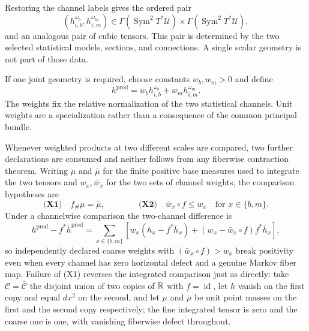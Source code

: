 Restoring the channel labels gives the ordered pair
\begin{equation}
(h_{i,b}^{\omega_b},h_{i,m}^{\omega_m})
\in\Gamma(\operatorname{Sym}^2T^*\mathcal U)
\times\Gamma(\operatorname{Sym}^2T^*\mathcal U),
\label{eq:pb-two-channel-pair}
\end{equation}
and an analogous pair of cubic tensors.  This pair is determined by the two
selected statistical models, sections, and connections.  A single scalar
geometry is not part of those data.  

If one joint geometry is required, choose constants $w_b,w_m>0$ and define
\begin{equation}
h^{\mathrm{prod}}
=w_bh_{i,b}^{\omega_b}+w_mh_{i,m}^{\omega_m}.
\label{eq:pb-weighted-channel-pullback}
\end{equation}
The weights fix the relative normalization of the two statistical channels.
Unit weights are a specialization rather than a consequence of the common
principal bundle.  

Whenever weighted products at two different scales are compared, two further
declarations are consumed and neither follows from any fiberwise contraction
theorem.  Writing $\mu$ and $\bar\mu$ for the finite positive base measures
used to integrate the two tensors and $w_x,\bar w_x$ for the two sets of
channel weights, the comparison hypotheses are
\begin{equation}
\textbf{(X1)}\quad f_\#\mu=\bar\mu,
\qquad\qquad
\textbf{(X2)}\quad \bar w_x\circ f\leq w_x
\quad\text{for }x\in\{b,m\}.
\label{eq:pb-cross-scale-declarations}
\end{equation}
Under a channelwise comparison the two-channel difference is
\begin{equation}
h^{\mathrm{prod}}-f^*\bar h^{\mathrm{prod}}
=\sum_{x\in\{b,m\}}
\left[
w_x\left(h_x-f^*\bar h_x\right)
+\left(w_x-\bar w_x\circ f\right)f^*\bar h_x
\right],
\label{eq:pb-two-channel-comparison}
\end{equation}
so independently declared coarse weights with $(\bar w_x\circ f)>w_x$ break
positivity even when every channel has zero horizontal defect and a genuine
Markov fiber map.  Failure of (X1) reverses the integrated comparison just as directly: take
$\mathcal C=\bar{\mathcal C}$ the disjoint union of two copies of $\mathbb R$ with
$f=\operatorname{id}$, let $h$ vanish on the first copy and equal $dx^2$ on the
second, and let $\mu$ and $\bar\mu$ be unit point masses on the first and the
second copy respectively; the fine integrated tensor is zero and the coarse one
is one, with vanishing fiberwise defect throughout.  

